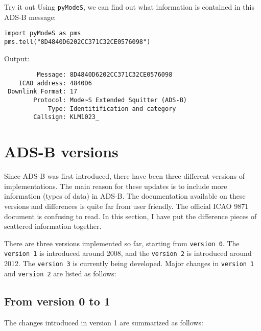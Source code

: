 \begin{notebox}{Try it out}
  Using \texttt{pyModeS}, we can find out what information is contained in this ADS-B message:

\begin{verbatim}
import pyModeS as pms
pms.tell("8D4840D6202CC371C32CE0576098")
\end{verbatim}

Output:

\begin{verbatim}
         Message: 8D4840D6202CC371C32CE0576098 
    ICAO address: 4840D6 
 Downlink Format: 17 
        Protocol: Mode~S Extended Squitter (ADS-B) 
            Type: Identitification and category 
        Callsign: KLM1023_ 
\end{verbatim}
  

\end{notebox}




\section{ADS-B versions}

Since ADS-B was first introduced, there have been three different versions of implementations. The main reason for these updates is to include more information (types of data) in ADS-B. The documentation available on these versions and differences is quite far from user friendly. The official ICAO 9871 document \cite{icao9871v1} is confusing to read. In this section, I have put the difference pieces of scattered information together.

There are three versions implemented so far, starting from \texttt{version 0}. The \texttt{version 1} is introduced around 2008, and the \texttt{version 2} is introduced around 2012. The \texttt{version 3} is currently being developed. Major changes in \texttt{version 1} and \texttt{version 2} are listed as follows:

\subsection{From version 0 to 1}

The changes introduced in version 1 are summarized as follows:

